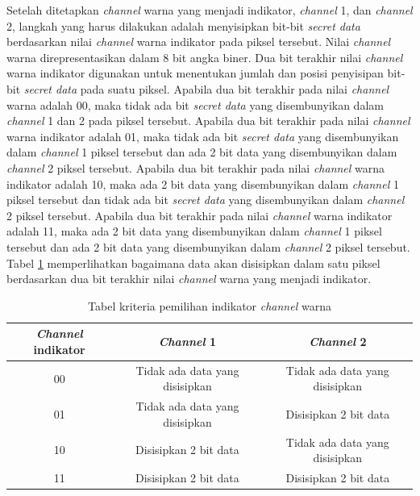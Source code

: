 \documentclass[a4paper,twoside]{article}
\begin{document}
\begin{enumerate}
\begin{itemize}
		Setelah ditetapkan \textit{channel} warna yang menjadi indikator, \textit{channel} 1, dan \textit{channel} 2, langkah yang harus dilakukan adalah menyisipkan bit-bit \textit{secret data} berdasarkan nilai \textit{channel} warna indikator pada piksel tersebut. Nilai \textit{channel} warna direpresentasikan dalam 8 bit angka biner. Dua bit terakhir nilai \textit{channel} warna indikator digunakan untuk menentukan jumlah dan posisi penyisipan bit-bit \textit{secret data} pada suatu piksel. Apabila dua bit terakhir pada nilai \textit{channel} warna adalah 00, maka tidak ada bit \textit{secret data} yang disembunyikan dalam \textit{channel} 1 dan 2 pada piksel tersebut. Apabila dua bit terakhir pada nilai \textit{channel} warna indikator adalah 01, maka tidak ada bit \textit{secret data} yang disembunyikan dalam \textit{channel} 1 piksel tersebut dan ada 2 bit data yang disembunyikan dalam \textit{channel} 2 piksel tersebut. Apabila dua bit terakhir pada nilai \textit{channel} warna indikator adalah 10, maka ada 2 bit data yang disembunyikan dalam \textit{channel} 1 piksel tersebut dan tidak ada bit \textit{secret data} yang disembunyikan dalam \textit{channel} 2 piksel tersebut. Apabila dua bit terakhir pada nilai \textit{channel} warna indikator adalah 11, maka ada 2 bit data yang disembunyikan dalam \textit{channel} 1 piksel tersebut dan ada 2 bit data yang disembunyikan dalam \textit{channel} 2 piksel tersebut. Tabel \ref{tabelIndAct} memperlihatkan bagaimana data akan disisipkan dalam satu piksel berdasarkan dua bit terakhir nilai \textit{channel} warna yang menjadi indikator.\\
		
		\begin{table}[!htbp]
		\centering
		\caption{Tabel kriteria pemilihan indikator \textit{channel} warna} 
		\label{tabelIndAct}
		\begin{tabular}{| c | c | c |}
		\hline
		\textit{Channel} indikator & \textit{Channel} 1 & \textit{Channel} 2\\
		\hline
		00 & Tidak ada data yang disisipkan & Tidak ada data yang disisipkan\\
		\hline
		01 & Tidak ada data yang disisipkan & Disisipkan 2 bit data\\
		\hline
		10 & Disisipkan 2 bit data & Tidak ada data yang disisipkan\\
		\hline
		11 & Disisipkan 2 bit data & Disisipkan 2 bit data\\
		\hline
		\end{tabular}
		\end{table}	
			

\end{itemize}
\end{enumerate}
\end{document}
